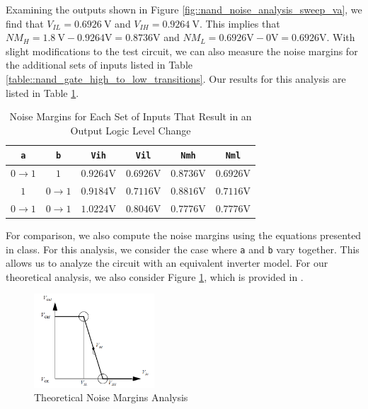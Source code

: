\documentclass{article}
\begin{document}
	Examining the outputs shown in Figure \ref{fig::nand_noise_analysis_sweep_va}, we find that $V_{IL} = 0.6926\ \text{V}$ and $V_{IH} = 0.9264\ \text{V}$. This implies that $NM_{H} = 1.8\ \text{V} - 0.9264 \text{V} = 0.8736 \text{V}$ and $NM_{L} = 0.6926 \text{V} - 0 \text{V} = 0.6926 \text{V}$. With slight modifications to the test circuit, we can also measure the noise margins for the additional sets of inputs listed in Table \ref{table::nand_gate_high_to_low_transitions}. Our results for this analysis are listed in Table \ref{table::nand_gate_noise_analysis}.
	
	\begin{table}[H]
	\begin{center}
	\caption{Noise Margins for Each Set of Inputs That Result in an Output Logic Level Change}
	\label{table::nand_gate_noise_analysis}
	\begin{tabular}{| c | c | c | c | c | c |}
		\hline
		\texttt{a} & \texttt{b} & \texttt{Vih} & \texttt{Vil} & \texttt{Nmh} & \texttt{Nml} \\
		\hline	
		$0 \rightarrow 1$ & $1$ & $0.9264 \text{V}$ & $0.6926 \text{V}$ & $0.8736 \text{V}$ & $0.6926 \text{V}$\\
		\hline	
		$1$ & $0 \rightarrow 1$ & $0.9184 \text{V}$ & $0.7116 \text{V}$ & $0.8816 \text{V}$ & $0.7116 \text{V}$\\
		\hline	
		$0 \rightarrow 1$ & $0 \rightarrow 1$ & $1.0224 \text{V}$ & $0.8046 \text{V}$ & $0.7776 \text{V}$ & $0.7776 \text{V}$\\
		\hline
	\end{tabular}
	\end{center}
	\end{table}
	
	For comparison, we also compute the noise margins using the equations presented in class. For this analysis, we consider the case where \texttt{a} and \texttt{b} vary together. This allows us to analyze the circuit with an equivalent inverter model. For our theoretical analysis, we also consider Figure \ref{fig::noise_margins_theory}, which is provided in \cite{rabaey_2003_digital}.
	
	\begin{figure}[H]
		\centerline{\includegraphics[width=0.4\textwidth]{noise_margins_theory.png}}
		\caption{Theoretical Noise Margins Analysis}
		\label{fig::noise_margins_theory}
	\end{figure}
	
\end{document}
